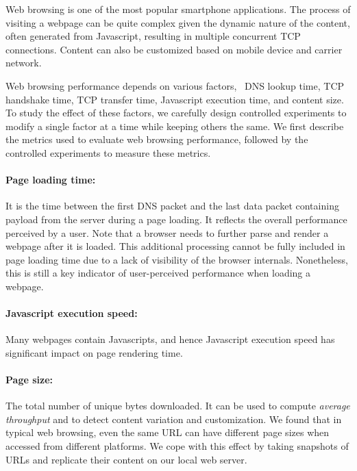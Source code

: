 Web browsing is one of the most popular smartphone applications. The 
process of visiting a webpage can be quite complex given the dynamic 
nature of the content, often generated from Javascript, resulting in 
multiple concurrent TCP connections. Content can also be customized 
based on mobile device and carrier network.

Web browsing performance depends on various factors, \eg~DNS lookup 
time, TCP handshake time, TCP transfer time, Javascript execution 
time, and content size. To study the effect of these factors, we 
carefully design controlled experiments to modify a single factor 
at a time while keeping others the same. We first describe the metrics 
used to evaluate web browsing performance, followed by the controlled 
experiments to measure these metrics.

\label{sec:method_web_metrics}

\paragraph{Page loading time:} It is the time between the first DNS packet 
and the last data packet containing payload from the server during a 
page loading. It reflects the overall performance perceived by a user. 
Note that a browser needs to further parse and render a webpage after 
it is loaded. This additional processing cannot be fully included in 
page loading time due to a lack of visibility of the browser internals. 
Nonetheless, this is still a key indicator of user-perceived performance 
when loading a webpage. 


\paragraph{Javascript execution speed:} Many webpages contain 
Javascripts, and hence Javascript execution speed has significant
impact on page rendering time. 



\paragraph{Page size:} The total number of unique bytes downloaded. 
It can be used to compute {\it average throughput} and to detect 
content variation and customization. 
We found that in typical web browsing, even the same URL can have different 
page sizes when accessed from different platforms. We cope with this 
effect by taking snapshots of URLs and replicate their content on our 
local web server.

